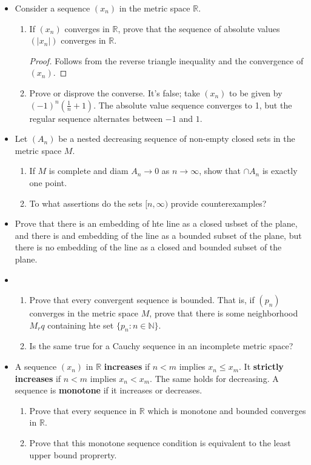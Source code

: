 \documentclass[11pt,a4paper]{article}
\newcommand{\pnum}[1]{\item[\textbf{#1}]}
\newcommand{\N}{\mathbb{N}}
\newcommand{\R}{\mathbb{R}}
\begin{document}
\begin{itemize}
	\pnum{2.26} Consider a sequence $(x_n)$ in the metric space $\R$.
	\begin{enumerate}[label=\alph*)]
		\item If $(x_n)$ converges in $\R$, prove that the sequence of absolute values $(|x_n|)$ converges
			in $\R$.
			\begin{proof}
				Follows from the reverse triangle inequality and the convergence of $(x_n)$.
			\end{proof}
		\item Prove or disprove the converse.
			It's false; take $(x_n)$ to be given by $(-1)^n \left( \frac{1}{n} + 1\right)$. The absolute 
			value sequence converges to 1, but the regular sequence alternates between $-1$ and $1$.
	\end{enumerate}
	\pnum{2.27} Let $(A_n)$ be a nested decreasing sequence of non-empty closed sets in the metric space
	$M$.
	\begin{enumerate}[label=\alph*)]
		\item If $M$ is complete and diam $A_n \to 0$ as $n \to \infty$, show that $\cap A_n$ is exactly
			one point.
		\item To what assertions do the sets $[n,\infty)$ provide counterexamples?
	\end{enumerate}

	\pnum{2.28} Prove that there is an embedding of hte line as a closed usbset of the plane, and there is
	and embedding of the line as a bounded subset of the plane, but there is no embedding of the line as
	a closed and bounded subset of the plane.

	\pnum{2.29}
	\begin{enumerate}[label=\alph*)]
		\item Prove that every convergent sequence is bounded. That is, if $(p_n)$ converges in the metric
			space $M$, prove that there is some neighborhood $M_r q$ containing hte set $\{p_n : n \in \N\}$.
		\item Is the same true for a Cauchy sequence in an incomplete metric space?
	\end{enumerate}

	\pnum{2.30} A sequence $(x_n)$ in $\R$ \textbf{increases} if $n < m$ implies $x_n \leq x_m$. It
	\textbf{strictly increases} if $n < m$ implies $x_n < x_m$. The same holds for decreasing. A sequence
	is \textbf{monotone} if it increases or decreases.
	\begin{enumerate}[label=\alph*)]
		\item Prove that every sequence in $\R$ which is monotone and bounded converges in $\R$.
		\item Prove that this monotone sequence condition is equivalent to the least upper bound proprerty.
	\end{enumerate}


\end{itemize}
\end{document}

